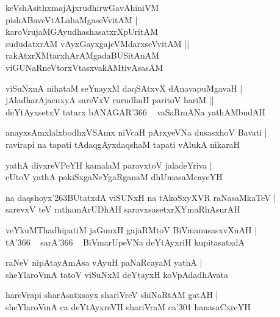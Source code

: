 \documentclass[twoside,12pt,openright]{book}
\def\S{\char'263}
\newcounter{shloka}[chapter]
\begin{document}
\begin{shloka}%
keVshAsithxmajAjxrudhirwGavAhiniVM \\
pishABaveVtALahaMgaseVvitAM |\\
karoVrujaMGAyudhashasatxrXpUritAM \\
sududatxrAM vAyxGayxgajeVMdarxseVvitAM ||\\
rakAtxrXMtarxhArAMgadaBUSitAnAM \\
viGUNaRneVtorxVtasxvakAMtivAsasAM
\end{shloka}

\begin{shloka}%
viSuNxnA nihataM seYnayxM daqSAtxvX dAnavapuMgavaH |\\
jAladharAjacnxyA sareVxV rurudhuH paritoV hariM ||\\
deYtAyxsetxV tatarx bANAGAR\char'366 ~ vaSaRmANa yathAMbudAH 
\end{shloka}

\begin{shloka}%
anayxsAmxlalxbodhxVSAmx niVcaH pArxyeVNa dusasxhoV Bavati |\\
ravirapi na tapati tAdaqgAyxdaqshaM tapati vAlukA nikaraH
\end{shloka}

\begin{shloka}%
yathA divxreVPeYH kamalaM paravxtoV jaladeYriva |\\
cUtoV yathA pakiSxgaNeYgaRganaM dhUmasaMcayeYH 
\end{shloka}

\begin{shloka}%
na daqshoyx\S BUtatxdA viSUNxH na tAkoSxyXVR raNasaMkaTeV |\\
sarevxV teV rathamArUDhAH saravxsasetxrXYmaRhAsurAH 
\end{shloka}

\begin{shloka}%
veYkuMThadhipatiM jaGunxH gajaRMtoV BiVmanusasxvXnAH |\\
tA\char'366 ~ sarA\char'366 ~ BiVmarUpeVNa deYtAyxriH kupitasatxdA
\end{shloka}

\begin{shloka}%
raNeV nipAtayAmAsa vAyuH paNaRcayaM yathA |\\
sheYlaroVmA tatoV viSuNxM deYtayxH koVpAdadhAvata
\end{shloka}

\begin{shloka}%
hareVrapi sharAsatxsayx shariVreV shiNaRtAM gatAH |\\
sheYlaroVmA ca deYtAyxreVH shariVraM ca\char'301 hanasaCxreYH
\end{shloka}
\end{document}
